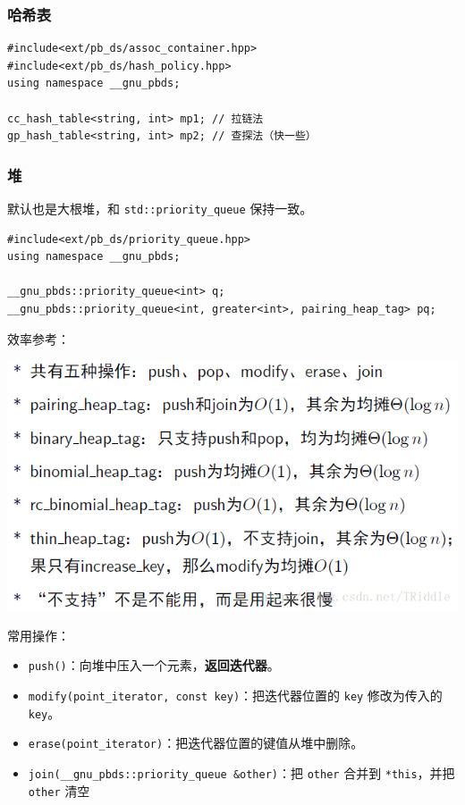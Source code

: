 \subsubsection{哈希表}

\begin{verbatim}
#include<ext/pb_ds/assoc_container.hpp>
#include<ext/pb_ds/hash_policy.hpp>
using namespace __gnu_pbds;

cc_hash_table<string, int> mp1; // 拉链法
gp_hash_table<string, int> mp2; // 查探法（快一些）
\end{verbatim}

\subsubsection{堆}

默认也是大根堆，和 \texttt{std::priority_queue} 保持一致。

\begin{verbatim}
#include<ext/pb_ds/priority_queue.hpp>
using namespace __gnu_pbds;

__gnu_pbds::priority_queue<int> q;
__gnu_pbds::priority_queue<int, greater<int>, pairing_heap_tag> pq;
\end{verbatim}

效率参考：

\includegraphics[scale = 0.385]{../src/misc/pbds_heap.png}

常用操作：

\begin{itemize}

	\item \texttt{push()}：向堆中压入一个元素，\textbf{返回迭代器}。
	\item \texttt{modify(point_iterator, const key)}：把迭代器位置的 \texttt{key} 修改为传入的 \texttt{key}。
	\item \texttt{erase(point_iterator)}：把迭代器位置的键值从堆中删除。
	\item \texttt{join(__gnu_pbds::priority_queue &other)}：把 \texttt{other} 合并到 \texttt{*this}，并把 \texttt{other} 清空
\end{itemize}

